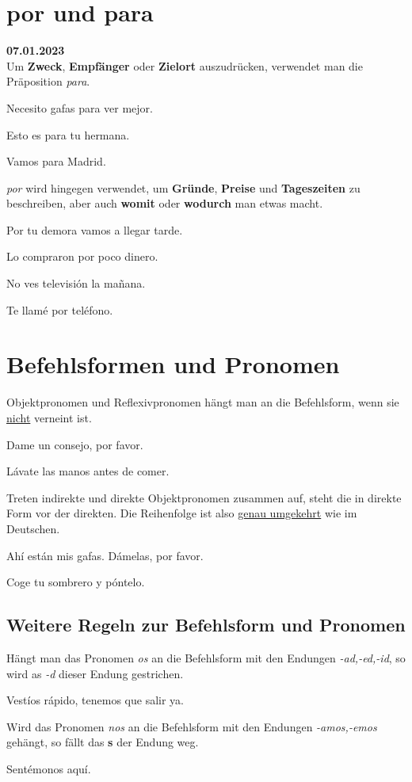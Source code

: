 \section{por und para}
\textbf{07.01.2023}\\
Um \textbf{Zweck}, \textbf{Empfänger} oder \textbf{Zielort}
auszudrücken, verwendet man die Präposition \textit{para}.
\begin{ejemplos}
    \item Necesito gafas para ver mejor.
    \item Esto es para tu hermana.
    \item Vamos para Madrid.
\end{ejemplos}
\textit{por} wird hingegen verwendet, um \textbf{Gründe},
\textbf{Preise} und \textbf{Tageszeiten} zu beschreiben, aber auch
\textbf{womit} oder \textbf{wodurch} man etwas macht.
\begin{ejemplos}
    \item Por tu demora vamos a llegar tarde.
    \item Lo compraron por poco dinero.
    \item No ves televisi\'on la ma\~nana.
    \item Te llam\'e por tel\'efono.
\end{ejemplos}
\section{Befehlsformen und Pronomen}
Objektpronomen und Reflexivpronomen hängt man an die Befehlsform,
wenn sie \underline{nicht} verneint ist.
\begin{ejemplos}
    \item Dame un consejo, por favor.
    \item L\'avate las manos antes de comer.
\end{ejemplos}
Treten indirekte und direkte Objektpronomen zusammen auf,
steht die in direkte Form vor der direkten. Die Reihenfolge
ist also \underline{genau umgekehrt} wie im Deutschen.
\begin{ejemplos}
    \item Ah\'i est\'an mis gafas. D\'amelas, por favor.
    \item Coge tu sombrero y p\'ontelo.
\end{ejemplos}
\subsection*{Weitere Regeln zur Befehlsform und Pronomen}
Hängt man das Pronomen \textit{os} an die Befehlsform mit den
Endungen \textit{-ad,-ed,-id}, so wird as \textit{-d} 
dieser Endung gestrichen.
\begin{ejemplos}
    \item Vest\'ios r\'apido, tenemos que salir ya.
\end{ejemplos}
Wird das Pronomen \textit{nos} an die Befehlsform mit den
Endungen \textit{-amos,-emos} gehängt, so fällt das \textbf{s}
der Endung weg.
\begin{ejemplos}
    \item Sent\'emonos aqu\'i.
\end{ejemplos}
